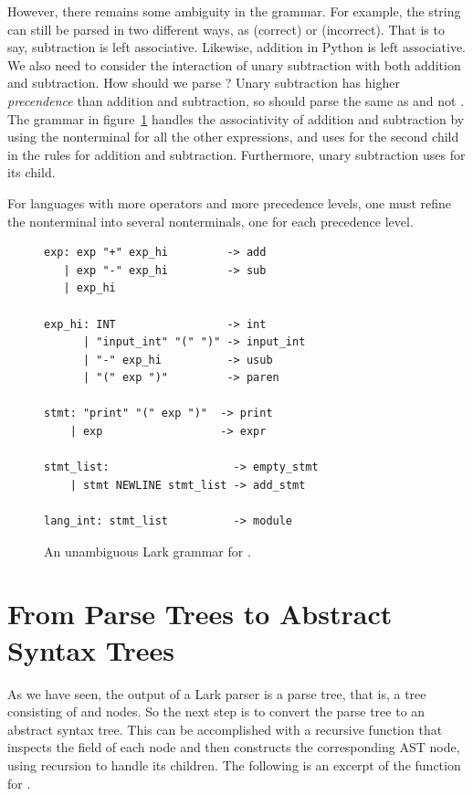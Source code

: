 \documentclass[7x10]{TimesAPriori_MIT}%
\numberwithin{theorem}{chapter}
\numberwithin{definition}{chapter}
\numberwithin{equation}{chapter}
\begin{document}
{However, there remains some ambiguity in the grammar. For example, the
string  can still be parsed in two different ways, as
 (correct) or  (incorrect).  That is
to say, subtraction is left associative. Likewise, addition in Python
is left associative. We also need to consider the interaction of unary
subtraction with both addition and subtraction. How should we parse
? Unary subtraction has higher
\emph{precendence} than addition and
subtraction, so  should parse the same as 
and not . The grammar in
figure~\ref{fig:Lint-lark-grammar} handles the associativity of
addition and subtraction by using the nonterminal  for
all the other expressions, and uses  for the second
child in the rules for addition and subtraction. Furthermore, unary
subtraction uses  for its child.

For languages with more operators and more precedence levels, one must
refine the  nonterminal into several nonterminals, one for
each precedence level.

\begin{figure}[tbp]
\begin{tcolorbox}[colback=white]
\centering
\begin{lstlisting}[escapechar=$]
exp: exp "+" exp_hi         -> add
   | exp "-" exp_hi         -> sub
   | exp_hi

exp_hi: INT                 -> int
      | "input_int" "(" ")" -> input_int
      | "-" exp_hi          -> usub
      | "(" exp ")"         -> paren

stmt: "print" "(" exp ")"  -> print
    | exp                  -> expr

stmt_list:                   -> empty_stmt
    | stmt NEWLINE stmt_list -> add_stmt

lang_int: stmt_list          -> module
\end{lstlisting}
\end{tcolorbox}
\caption{An unambiguous Lark grammar for \LangInt{}.}
\label{fig:Lint-lark-grammar}
\end{figure}

\section{From Parse Trees to Abstract Syntax Trees}

As we have seen, the output of a Lark parser is a parse tree, that is,
a tree consisting of  and  nodes. So the next
step is to convert the parse tree to an abstract syntax tree. This can
be accomplished with a recursive function that inspects the
 field of each node and then constructs the corresponding
AST node, using recursion to handle its children. The following is an
excerpt of the  function for \LangInt{}.

}
\end{document}

